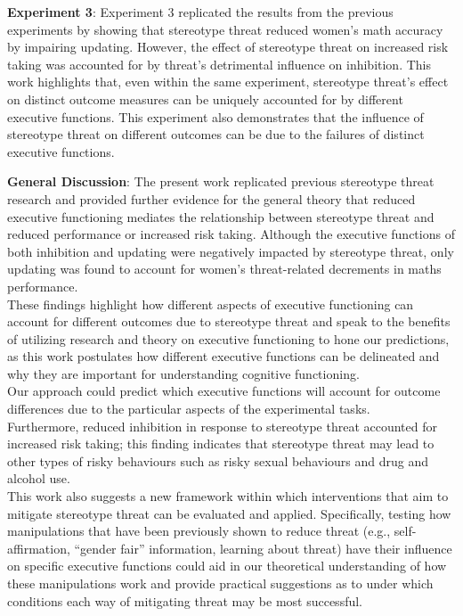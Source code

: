 \documentclass[
  doc, a4paper]{apa7}
\begin{document}
\textbf{Experiment 3}:
Experiment 3 replicated the results from the previous experiments by showing that stereotype threat reduced women's math accuracy by impairing updating. However, the effect of stereotype threat on increased risk taking was accounted for by threat's detrimental influence on inhibition. This work highlights that, even within the same experiment, stereotype threat's effect on distinct outcome measures can be uniquely accounted for by different executive functions. This experiment also demonstrates that the influence of stereotype threat on different outcomes can be due to the failures of distinct executive functions.

\textbf{General Discussion}:
The present work replicated previous stereotype threat research and provided further evidence for the general theory that reduced executive functioning mediates the relationship between stereotype threat and reduced performance or increased risk taking. Although the executive functions of both inhibition and updating were negatively impacted by stereotype threat, only updating was found to account for women's threat-related decrements in maths performance.\\
These findings highlight how different aspects of executive functioning can account for different outcomes due to stereotype threat and speak to the benefits of utilizing research and theory on executive functioning to hone our predictions, as this work postulates how different executive functions can be delineated and why they are important for understanding cognitive functioning.\\
Our approach could predict which executive functions will account for outcome differences due to the particular aspects of the experimental tasks.\\
Furthermore, reduced inhibition in response to stereotype threat accounted for increased risk taking; this finding indicates that stereotype threat may lead to other types of risky behaviours such as risky sexual behaviours and drug and alcohol use.\\
This work also suggests a new framework within which interventions that aim to mitigate stereotype threat can be evaluated and applied. Specifically, testing how manipulations that have been previously shown to reduce threat (e.g., self-affirmation, ``gender fair'' information, learning about threat) have their influence on specific executive functions could aid in our theoretical understanding of how these manipulations work and provide practical suggestions as to under which conditions each way of mitigating threat may be most successful.
\end{document}
